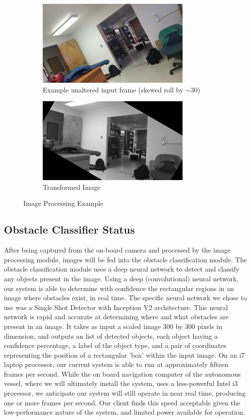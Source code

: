 \documentclass[onecolumn, draftclsnofoot,10pt, compsoc]{IEEEtran}
\begin{document}
\begin{figure}[H]
\centering
\begin{subfigure}{.5\textwidth}
  \centering
  \includegraphics[width=3in]{cs462_img_proc_before.jpg}
  \caption{Example unaltered input frame  (skewed roll by $\sim$30\textdegree)}
  \label{fig:sub1}
\end{subfigure}%
\begin{subfigure}{.5\textwidth}
  \centering
  \includegraphics[width=3in]{cs462_img_proc_after.jpg}
  \caption{Transformed Image }
  \label{fig:sub2}
\end{subfigure}
\caption{Image Processing Example}
\label{fig:image-processing}
\end{figure}

\subsection{Obstacle Classifier Status}
After being captured from the on-board camera and processed by the image processing module, images will be fed into the obstacle classification module. The obstacle classification module uses a deep neural network to detect and classify any objects present in the image. Using a deep (convolutional) neural network, our system is able to determine with confidence the rectangular regions in an image where obstacles exist, in real time. The specific neural network we chose to use was a Single Shot Detector with Inception V2 architecture. This neural network is rapid and accurate at determining where and what obstacles are present in an image. It takes as input a scaled image 300 by 300 pixels in dimension, and outputs an list of detected objects, each object having a confidence percentage, a label of the object type, and a pair of coordinates representing the position of a rectangular 'box' within the input image. On an i7 laptop processor, our current system is able to run at approximately fifteen frames per second. While the on board navigation computer of the autonomous vessel, where we will ultimately install the system, uses a less-powerful Intel i3 processor, we anticipate our system will still operate in near real time, producing one or more frames per second. Our client finds this speed acceptable given the low-performance nature of the system, and limited power available for operation.
\end{document}
